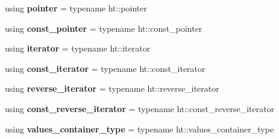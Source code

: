 \begin{DoxyCompactItemize}
using {\bfseries pointer} = typename ht\+::pointer
\item 
\mbox{\label{classtsl_1_1ordered__set_a3bd3a5ea8376cdc30c81eb93283b352b}} 
using {\bfseries const\+\_\+pointer} = typename ht\+::const\+\_\+pointer
\item 
\mbox{\label{classtsl_1_1ordered__set_a6b02aa2270e720edf5b8a30b106e7346}} 
using {\bfseries iterator} = typename ht\+::iterator
\item 
\mbox{\label{classtsl_1_1ordered__set_a3a1996923ed0d9b62d7d959af57a1be3}} 
using {\bfseries const\+\_\+iterator} = typename ht\+::const\+\_\+iterator
\item 
\mbox{\label{classtsl_1_1ordered__set_a850e708a94572268b80d79d8238c74fd}} 
using {\bfseries reverse\+\_\+iterator} = typename ht\+::reverse\+\_\+iterator
\item 
\mbox{\label{classtsl_1_1ordered__set_ac4cdc912734a2b6757cbb816ab2657ea}} 
using {\bfseries const\+\_\+reverse\+\_\+iterator} = typename ht\+::const\+\_\+reverse\+\_\+iterator
\item 
\mbox{\label{classtsl_1_1ordered__set_af68942b7edb65da7c0ec756b7172f497}} 
using {\bfseries values\+\_\+container\+\_\+type} = typename ht\+::values\+\_\+container\+\_\+type
\end{DoxyCompactItemize}
